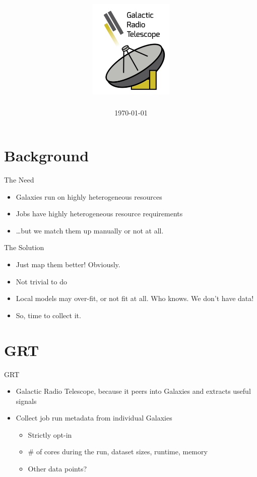 \documentclass[12pt]{beamer}
\title[GRT]{\includegraphics[width=4cm]{img/grt.png}}
\author[\myName\\ \color{gray} \myGpgFingerprint]{\myName}
\date[\today]{\today}
\begin{document}
\frame{\titlepage}

\section{Background}
\begin{frame}{The Need}
    \begin{itemize}
        \item Galaxies run on highly heterogeneous resources
        \item Jobs have highly heterogeneous resource requirements
        \item \ldots{}but we match them up manually or not at all.
    \end{itemize}
\end{frame}

\begin{frame}{The Solution}
    \begin{itemize}
        \item Just map them better! Obviously.
        \item Not trivial to do
        \item Local models may over-fit, or not fit at all. Who knows. We don't have data!
        \item So, time to collect it.
    \end{itemize}
\end{frame}

\section{GRT}
\begin{frame}{GRT}
    \begin{itemize}
        \item Galactic Radio Telescope, because it peers into Galaxies and extracts useful signals
        \item Collect job run metadata from individual Galaxies
        \begin{itemize}
            \item Strictly opt-in
            \item \# of cores during the run, dataset sizes, runtime, memory
            \item Other data points?
        \end{itemize}
    \end{itemize}
\end{frame}
\end{document}
